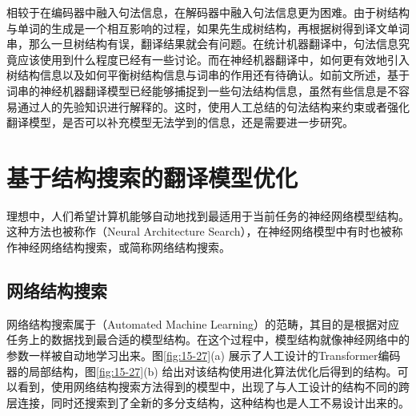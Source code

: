 \parinterval 相较于在编码器中融入句法信息，在解码器中融入句法信息更为困难。由于树结构与单词的生成是一个相互影响的过程，如果先生成树结构，再根据树得到译文单词串，那么一旦树结构有误，翻译结果就会有问题。在统计机器翻译中，句法信息究竟应该使用到什么程度已经有一些讨论。而在神经机器翻译中，如何更有效地引入树结构信息以及如何平衡树结构信息与词串的作用还有待确认。如前文所述，基于词串的神经机器翻译模型已经能够捕捉到一些句法结构信息，虽然有些信息是不容易通过人的先验知识进行解释的。这时，使用人工总结的句法结构来约束或者强化翻译模型，是否可以补充模型无法学到的信息，还是需要进一步研究。


\sectionnewpage
\section{基于结构搜索的翻译模型优化}

\parinterval 理想中，人们希望计算机能够自动地找到最适用于当前任务的神经网络模型结构。这种方法也被称作{\small{}}（Neural Architecture Search），在神经网络模型中有时也被称作神经网络结构搜索，或简称网络结构搜索。


\subsection{网络结构搜索}

\parinterval 网络结构搜索属于{\small{}}（Automated Machine Learning）的范畴，其目的是根据对应任务上的数据找到最合适的模型结构。在这个过程中，模型结构就像神经网络中的参数一样被自动地学习出来。图\ref{fig:15-27}(a) 展示了人工设计的Transformer编码器的局部结构，图\ref{fig:15-27}(b) 给出对该结构使用进化算法优化后得到的结构。可以看到，使用网络结构搜索方法得到的模型中，出现了与人工设计的结构不同的跨层连接，同时还搜索到了全新的多分支结构，这种结构也是人工不易设计出来的。

